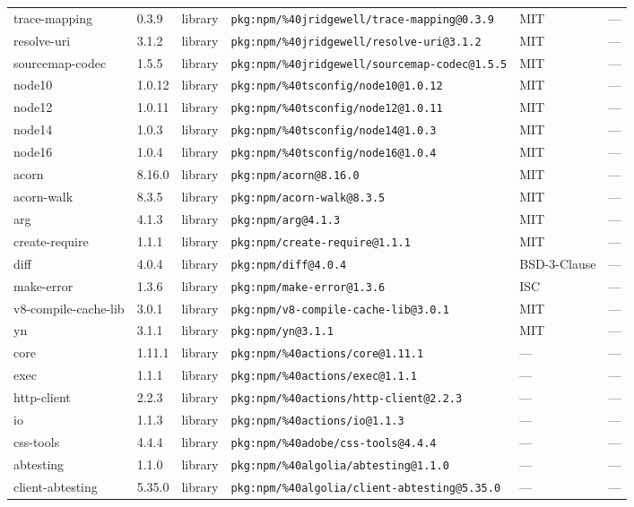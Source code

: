 \documentclass[11pt]{article}
\begin{document}
\begin{longtable}{|l|l|l|p{2.2cm}|l|p{4cm}|}
trace-mapping & 0.3.9 & library & \texttt{pkg:npm/\%40jridgewell/trace-mapping@0.3.9} & MIT & — \\
resolve-uri & 3.1.2 & library & \texttt{pkg:npm/\%40jridgewell/resolve-uri@3.1.2} & MIT & — \\
sourcemap-codec & 1.5.5 & library & \texttt{pkg:npm/\%40jridgewell/sourcemap-codec@1.5.5} & MIT & — \\
node10 & 1.0.12 & library & \texttt{pkg:npm/\%40tsconfig/node10@1.0.12} & MIT & — \\
node12 & 1.0.11 & library & \texttt{pkg:npm/\%40tsconfig/node12@1.0.11} & MIT & — \\
node14 & 1.0.3 & library & \texttt{pkg:npm/\%40tsconfig/node14@1.0.3} & MIT & — \\
node16 & 1.0.4 & library & \texttt{pkg:npm/\%40tsconfig/node16@1.0.4} & MIT & — \\
acorn & 8.16.0 & library & \texttt{pkg:npm/acorn@8.16.0} & MIT & — \\
acorn-walk & 8.3.5 & library & \texttt{pkg:npm/acorn-walk@8.3.5} & MIT & — \\
arg & 4.1.3 & library & \texttt{pkg:npm/arg@4.1.3} & MIT & — \\
create-require & 1.1.1 & library & \texttt{pkg:npm/create-require@1.1.1} & MIT & — \\
diff & 4.0.4 & library & \texttt{pkg:npm/diff@4.0.4} & BSD-3-Clause & — \\
make-error & 1.3.6 & library & \texttt{pkg:npm/make-error@1.3.6} & ISC & — \\
v8-compile-cache-lib & 3.0.1 & library & \texttt{pkg:npm/v8-compile-cache-lib@3.0.1} & MIT & — \\
yn & 3.1.1 & library & \texttt{pkg:npm/yn@3.1.1} & MIT & — \\
core & 1.11.1 & library & \texttt{pkg:npm/\%40actions/core@1.11.1} & — & — \\
exec & 1.1.1 & library & \texttt{pkg:npm/\%40actions/exec@1.1.1} & — & — \\
http-client & 2.2.3 & library & \texttt{pkg:npm/\%40actions/http-client@2.2.3} & — & — \\
io & 1.1.3 & library & \texttt{pkg:npm/\%40actions/io@1.1.3} & — & — \\
css-tools & 4.4.4 & library & \texttt{pkg:npm/\%40adobe/css-tools@4.4.4} & — & — \\
abtesting & 1.1.0 & library & \texttt{pkg:npm/\%40algolia/abtesting@1.1.0} & — & — \\
client-abtesting & 5.35.0 & library & \texttt{pkg:npm/\%40algolia/client-abtesting@5.35.0} & — & — \\

\end{longtable}
\end{document}
